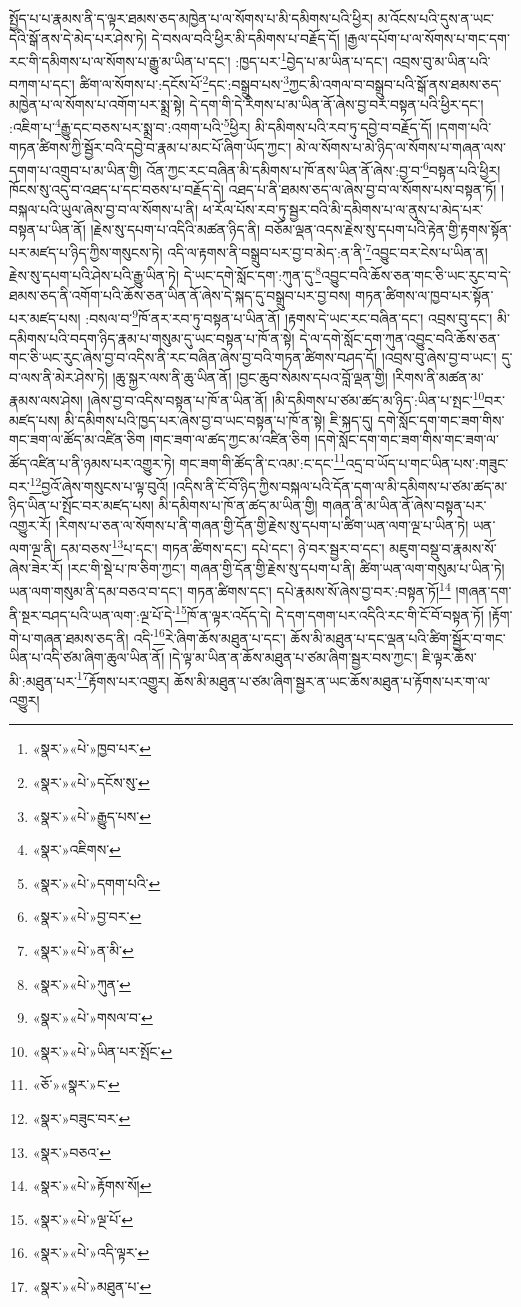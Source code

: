 སྤྱོད་པ་པ་རྣམས་ནི་ད་ལྟར་ཐམས་ཅད་མཁྱེན་པ་ལ་སོགས་པ་མི་དམིགས་པའི་ཕྱིར། མ་འོངས་པའི་དུས་ན་ཡང་དེའི་སྒོ་ནས་དེ་མེད་པར་ཤེས་ཏེ། དེ་བསལ་བའི་ཕྱིར་མི་དམིགས་པ་བརྗོད་དོ། །རྒྱལ་དཔོག་པ་ལ་སོགས་པ་གང་དག་རང་གི་དམིགས་པ་ལ་སོགས་པ་རྒྱུ་མ་ཡིན་པ་དང་། :ཁྱད་པར་\footnote{«སྣར་»«པེ་»ཁྱབ་པར་}བྱེད་པ་མ་ཡིན་པ་དང་། འབྲས་བུ་མ་ཡིན་པའི་བཀག་པ་དང་། ཚིག་ལ་སོགས་པ་:དངོས་པོ་\footnote{«སྣར་»«པེ་»དངོས་སུ་}དང་:བསྒྲུབ་པས་\footnote{«སྣར་»«པེ་»རྒྱུད་པས་}ཀྱང་མི་འགལ་བ་བསྒྲུབ་པའི་སྒོ་ནས་ཐམས་ཅད་མཁྱེན་པ་ལ་སོགས་པ་འགོག་པར་སྨྲ་སྟེ། དེ་དག་གི་དེ་རིགས་པ་མ་ཡིན་ནོ་ཞེས་བྱ་བར་བསྟན་པའི་ཕྱིར་དང་། :འཇིག་པ་\footnote{«སྣར་»འཇིགས་}རྒྱུ་དང་བཅས་པར་སྨྲ་བ་:འགག་པའི་\footnote{«སྣར་»«པེ་»དགག་པའི་}ཕྱིར། མི་དམིགས་པའི་རབ་ཏུ་དབྱེ་བ་བརྗོད་དོ། །དགག་པའི་གཏན་ཚིགས་ཀྱི་སྦྱོར་བའི་དབྱེ་བ་རྣམ་པ་མང་པོ་ཞིག་ཡོད་ཀྱང་། མེ་ལ་སོགས་པ་མེ་ཉིད་ལ་སོགས་པ་གཞན་ལས་དགག་པ་འགྲུབ་པ་མ་ཡིན་གྱི། འོན་ཀྱང་རང་བཞིན་མི་དམིགས་པ་ཁོ་ནས་ཡིན་ནོ་ཞེས་:བྱ་བ་\footnote{«སྣར་»«པེ་»བྱ་བར་}བསྟན་པའི་ཕྱིར། ཁོངས་སུ་འདུ་བ་འཐད་པ་དང་བཅས་པ་བརྗོད་དེ། འཐད་པ་ནི་ཐམས་ཅད་ལ་ཞེས་བྱ་བ་ལ་སོགས་པས་བསྟན་ཏོ། །བསྐལ་པའི་ཡུལ་ཞེས་བྱ་བ་ལ་སོགས་པ་ནི། ཕ་རོལ་པོས་རབ་ཏུ་སྦྱར་བའི་མི་དམིགས་པ་ལ་ནུས་པ་མེད་པར་བསྟན་པ་ཡིན་ནོ། །རྗེས་སུ་དཔག་པ་འདིའི་མཚན་ཉིད་ནི། བཅོམ་ལྡན་འདས་རྗེས་སུ་དཔག་པའི་རྟེན་གྱི་རྟགས་སྟོན་པར་མཛད་པ་ཉིད་ཀྱིས་གསུངས་ཏེ། འདི་ལ་རྟགས་ནི་བསྒྲུབ་པར་བྱ་བ་མེད་:ན་ནི་\footnote{«སྣར་»«པེ་»ན་མི་}འབྱུང་བར་ངེས་པ་ཡིན་ན། རྗེས་སུ་དཔག་པའི་ཤེས་པའི་རྒྱུ་ཡིན་ཏེ། དེ་ཡང་དགེ་སློང་དག་:ཀུན་དུ་\footnote{«སྣར་»«པེ་»ཀུན་}འབྱུང་བའི་ཆོས་ཅན་གང་ཅི་ཡང་རུང་བ་དེ་ཐམས་ཅད་ནི་འགོག་པའི་ཆོས་ཅན་ཡིན་ནོ་ཞེས་དེ་སྐད་དུ་བསྒྲུབ་པར་བྱ་བས། གཏན་ཚིགས་ལ་ཁྱབ་པར་སྟོན་པར་མཛད་པས། :བསལ་བ་\footnote{«སྣར་»«པེ་»གསལ་བ་}ཁོ་ནར་རབ་ཏུ་བསྟན་པ་ཡིན་ནོ། །རྟགས་དེ་ཡང་རང་བཞིན་དང་། འབྲས་བུ་དང་། མི་དམིགས་པའི་བདག་ཉིད་རྣམ་པ་གསུམ་དུ་ཡང་བསྟན་པ་ཁོ་ན་སྟེ། དེ་ལ་དགེ་སློང་དག་ཀུན་འབྱུང་བའི་ཆོས་ཅན་གང་ཅི་ཡང་རུང་ཞེས་བྱ་བ་འདིས་ནི་རང་བཞིན་ཞེས་བྱ་བའི་གཏན་ཚིགས་བཤད་དོ། །འབྲས་བུ་ཞེས་བྱ་བ་ཡང་། དུ་བ་ལས་ནི་མེར་ཤེས་ཏེ། །ཆུ་སྐྱར་ལས་ནི་ཆུ་ཡིན་ནོ། །བྱང་ཆུབ་སེམས་དཔའ་བློ་ལྡན་གྱི། །རིགས་ནི་མཚན་མ་རྣམས་ལས་ཤེས། །ཞེས་བྱ་བ་འདིས་བསྟན་པ་ཁོ་ན་ཡིན་ནོ། །མི་དམིགས་པ་ཙམ་ཚད་མ་ཉིད་:ཡིན་པ་སྤང་\footnote{«སྣར་»«པེ་»ཡིན་པར་སྤོང་}བར་མཛད་པས། མི་དམིགས་པའི་ཁྱད་པར་ཞེས་བྱ་བ་ཡང་བསྟན་པ་ཁོ་ན་སྟེ། ཇི་སྐད་དུ། དགེ་སློང་དག་གང་ཟག་གིས་གང་ཟག་ལ་ཚོད་མ་འཛིན་ཅིག །གང་ཟག་ལ་ཚད་ཀྱང་མ་འཛིན་ཅིག །དགེ་སློང་དག་གང་ཟག་གིས་གང་ཟག་ལ་ཚོད་འཛིན་པ་ནི་ཉམས་པར་འགྱུར་ཏེ། གང་ཟག་གི་ཚོད་ནི་ང་འམ་:ང་དང་\footnote{«ཅོ་»«སྣར་»ང་}འདྲ་བ་ཡོད་པ་གང་ཡིན་པས་:གཟུང་བར་\footnote{«སྣར་»བཟུང་བར་}བྱའོ་ཞེས་གསུངས་པ་ལྟ་བུའོ། །འདིས་ནི་ངོ་བོ་ཉིད་ཀྱིས་བསྐལ་པའི་དོན་དག་ལ་མི་དམིགས་པ་ཙམ་ཚད་མ་ཉིད་ཡིན་པ་སྤོང་བར་མཛད་པས། མི་དམིགས་པ་ཁོ་ན་ཚད་མ་ཡིན་གྱི། གཞན་ནི་མ་ཡིན་ནོ་ཞེས་བསྟན་པར་འགྱུར་རོ། །རིགས་པ་ཅན་ལ་སོགས་པ་ནི་གཞན་གྱི་དོན་གྱི་རྗེས་སུ་དཔག་པ་ཚིག་ཡན་ལག་ལྔ་པ་ཡིན་ཏེ། ཡན་ལག་ལྔ་ནི། དམ་བཅས་\footnote{«སྣར་»བཅའ་}པ་དང་། གཏན་ཚིགས་དང་། དཔེ་དང་། ཉེ་བར་སྦྱར་བ་དང་། མཇུག་བསྡུ་བ་རྣམས་སོ་ཞེས་ཟེར་རོ། །རང་གི་སྡེ་པ་ཁ་ཅིག་ཀྱང་། གཞན་གྱི་དོན་གྱི་རྗེས་སུ་དཔག་པ་ནི། ཚིག་ཡན་ལག་གསུམ་པ་ཡིན་ཏེ། ཡན་ལག་གསུམ་ནི་དམ་བཅའ་བ་དང་། གཏན་ཚིགས་དང་། དཔེ་རྣམས་སོ་ཞེས་བྱ་བར་:བསྟན་ཏོ།\footnote{«སྣར་»«པེ་»རྟོགས་སོ།} །གཞན་དག་ནི་སྔར་བཤད་པའི་ཡན་ལག་:ལྔ་པོ་དེ་\footnote{«སྣར་»«པེ་»ལྔ་པོ་}ཁོ་ན་ལྟར་འདོད་དེ། དེ་དག་དགག་པར་འདིའི་རང་གི་ངོ་བོ་བསྟན་ཏོ། །རྟོག་གེ་པ་གཞན་ཐམས་ཅད་ནི། འདི་\footnote{«སྣར་»«པེ་»འདི་ལྟར་}རེ་ཞིག་ཆོས་མཐུན་པ་དང་། ཆོས་མི་མཐུན་པ་དང་ལྡན་པའི་ཚིག་སྦྱོར་བ་གང་ཡིན་པ་འདི་ཙམ་ཞིག་ཆུལ་ཡིན་ནོ། །དེ་ལྟ་མ་ཡིན་ན་ཆོས་མཐུན་པ་ཙམ་ཞིག་སྦྱར་བས་ཀྱང་། ཇི་ལྟར་ཆོས་མི་:མཐུན་པར་\footnote{«སྣར་»«པེ་»མཐུན་པ་}རྟོགས་པར་འགྱུར། ཆོས་མི་མཐུན་པ་ཙམ་ཞིག་སྦྱར་ན་ཡང་ཆོས་མཐུན་པ་རྟོགས་པར་ག་ལ་འགྱུར། 